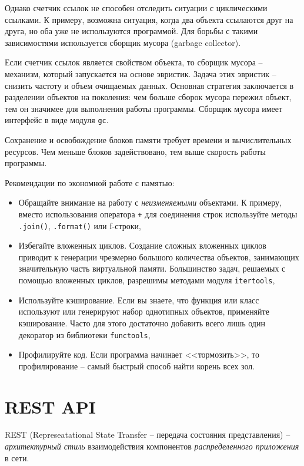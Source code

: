\documentclass[%
	11pt,
	a4paper,
	utf8,
		]{article}
\begin{document}
Однако счетчик ссылок не способен отследить ситуации с циклическими ссылками. К примеру, возможна ситуация, когда два объекта ссылаются друг на друга, но оба уже не используются программой. Для борьбы с такими зависимостями используется сборщик мусора (garbage collector).

Если счетчик ссылок является свойством объекта, то сборщик мусора -- механизм, который запускается на основе эвристик. Задача этих эвристик -- снизить частоту и объем очищаемых данных. Основная стратегия заключается в разделении объектов на поколения: чем больше сборок мусора пережил объект, тем он значимее для выполнения работы программы. Сборщик мусора имеет интерфейс в виде модуля \texttt{gc}.

Сохранение и освобождение блоков памяти требует времени и вычислительных ресурсов. Чем меньше блоков задействовано, тем выше скорость работы программы.

Рекомендации по экономной работе с памятью:
\begin{itemize}
	\item Обращайте внимание на работу с \emph{неизменяемыми} объектами. К примеру, вместо использования оператора \texttt{+} для соединения строк используйте методы \texttt{.join()}, \texttt{.format()} или f-строки,
	
	\item Избегайте вложенных циклов. Создание сложных вложенных циклов приводит к генерации чрезмерно большого количества объектов, занимающих значительную часть виртуальной памяти. Большинство задач, решаемых с помощью вложенных циклов, разрешимы методами модуля \texttt{itertools},
	
	\item Используйте кэширование. Если вы знаете, что функция или класс используют или генерируют набор однотипных объектов, применяйте кэширование. Часто для этого достаточно добавить всего лишь один декоратор из библиотеки \texttt{functools},
	
	\item Профилируйте код. Если программа начинает <<тормозить>>, то профилирование -- самый быстрый способ найти корень всех зол.
\end{itemize}

\section{REST API}

REST (Represeatational State Transfer -- передача состояния представления) -- \emph{архитектурный стиль} взаимодействия компонентов \emph{распределенного приложения} в сети.
\end{document}
